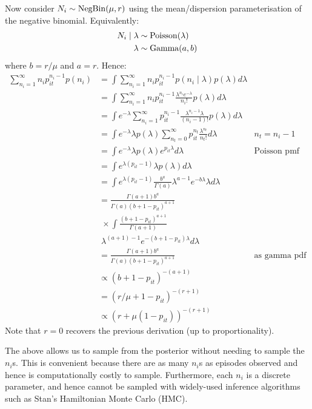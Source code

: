 \documentclass[thesis.tex]{subfiles}
\begin{document}
Now consider $N_i \sim \operatorname{NegBin}(\mu, r)$ using the
mean/dispersion parameterisation of the negative binomial. Equivalently:
\begin{align}
N_i \mid \lambda &\sim \operatorname{Poisson}(\lambda) \\
\lambda &\sim \operatorname{Gamma}(a, b)
\end{align}
where $b = r / \mu$ and $a = r$.
Hence:
\begin{align}
\sum_{n_i=1}^\infty n_i p_{it}^{n_i- 1} p(n_i) 
&= \int \sum_{n_i=1}^\infty n_i p_{it}^{n_i- 1} p(n_i \mid \lambda) p(\lambda) d\lambda \\
&= \int \sum_{n_i=1}^\infty n_i p_{it}^{n_i- 1} \frac{\lambda^{n_i} e^{-\lambda}}{n_i!} p(\lambda) d\lambda \\
&= \int e^{-\lambda} \sum_{n_i=1}^\infty p_{it}^{n_i- 1} \frac{\lambda^{n_i-1}\lambda }{(n_i-1)!} p(\lambda) d\lambda \\
&= \int e^{-\lambda} \lambda p(\lambda) \sum_{n_t=0}^\infty p_{it}^{n_t} \frac{\lambda^{n_t} }{n_t!} d\lambda &n_t = n_i - 1 \\
&= \int e^{-\lambda} \lambda p(\lambda) e^{p_{it}\lambda} d\lambda &\text{Poisson pmf} \\
&= \int e^{\lambda (p_{it} - 1)} \lambda p(\lambda) d\lambda \\
&= \int e^{\lambda (p_{it} - 1)} \frac{b^a}{\Gamma(a)} \lambda^{a-1} e^{-b\lambda} \lambda d\lambda \\
&= \frac{\Gamma(a+1)b^a}{\Gamma(a) (b+1-p_{it})^{a+1}} \\ 
  &\; \times \int \frac{(b+1-p_{it})^{a+1}}{\Gamma(a+1)} \\
  &\; \lambda^{(a+1)-1} e^{-(b+1-p_{it})\lambda} d\lambda \\
&= \frac{\Gamma(a+1)b^a}{\Gamma(a) (b+1-p_{it})^{a+1}} &\text{as gamma pdf} \\
&\propto (b+1-p_{it})^{-(a+1)} \\
&= (r/\mu+1-p_{it})^{-(r+1)} \\
&\propto (r+\mu (1-p_{it}))^{-(r+1)}
\end{align}
Note that $r=0$ recovers the previous derivation (up to
proportionality).

The above allows us to sample from the posterior without needing to
sample the $n_i$s. This is convenient because there are as many
$n_i$s as episodes observed and hence is computationally costly to
sample. Furthermore, each $n_i$ is a discrete parameter, and hence
cannot be sampled with widely-used inference algorithms such as Stan's Hamiltonian Monte Carlo (HMC).
\end{document}
